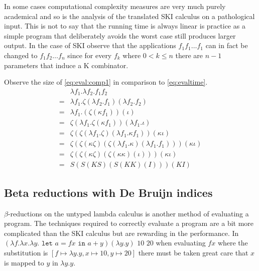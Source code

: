 \documentclass[11pt,oneside,a4paper]{report}
\begin{document}
In some cases computational complexity measures are very much purely academical and so is the analysis of the translated SKI calculus on a pathological input.
This is not to say that the running time is always linear is practice as a simple program that deliberately avoids the worst case still produces larger output.
In the case of SKI observe that the applications $f_1 f_1 \dots f_1$ can in fact be changed to $f_1 f_2 \dots f_n$ since for every $f_k$ where $0 < k \leq n$ there are $n - 1$ parameters that induce a K combinator.
\begin{exmp}
    Observe the size of \autoref{eq:eval:comp1} in comparison to \autoref{eq:evaltime}.
\begin{align}
    &\lambda f_1 . \lambda f_2 . f_1 f_2 \label{eq:eval:comp1}\\
    =&\lambda f_1 . \zeta(\lambda f_2 . f_1)(\lambda f_2 . f_2) \tag*{} \\
    =&\lambda f_1 . (\zeta(\kappa f_1))(\iota) \tag*{} \\
    =&\zeta (\lambda f_1 . \zeta (\kappa f_1)) (\lambda f_1 . \iota) \tag*{} \\
    =&\zeta (\zeta (\lambda f_1 . \zeta) (\lambda f_1 . \kappa f_1)) (\kappa \iota) \tag*{} \\
    =&\zeta (\zeta (\kappa \zeta) (\zeta (\lambda f_1 . \kappa) (\lambda f_1 . f_1))) (\kappa \iota) \tag*{} \\
    =&\zeta (\zeta (\kappa \zeta) (\zeta (\kappa \kappa) (\iota))) (\kappa \iota) \tag*{} \\
    =&S (S (K S) (S (K K) (I))) (K I) \tag*{}
\end{align}
\end{exmp}

\subsection{Beta reductions with De Bruijn indices}
$\beta$-reductions on the untyped lambda calculus is another method of evaluating a program.
The techniques required to correctly evaluate a program are a bit more complicated than the SKI calculus but are rewarding in the performance.
In $(\lambda f . \lambda x . \lambda y. \texttt{ let } a = f x \texttt{ in } a + y)(\lambda y . y) \,\, 10 \,\, 20$ when evaluating $f x$ where the substitution is $[f \mapsto \lambda y . y, x \mapsto 10, y \mapsto 20]$ there must be taken great care that $x$ is mapped to $y$ in $\lambda y . y$.
\end{document}
